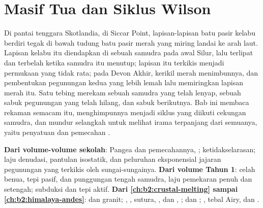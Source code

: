 \chapter{Masif Tua dan Siklus Wilson}\label{ch:b2:wilson-cycle}

Di pantai tenggara Skotlandia, di Siccar Point, lapisan-lapisan batu pasir kelabu berdiri tegak
di bawah tudung batu pasir merah yang miring landai ke arah laut. Lapisan kelabu itu diendapkan di
sebuah samudra pada awal Silur, lalu terlipat dan terbelah ketika samudra itu menutup; lapisan itu terkikis
menjadi permukaan yang tidak rata; pada Devon Akhir, kerikil merah menimbunnya, dan pembentukan pegunungan kedua
yang lebih lemah lalu memiringkan lapisan merah itu. Satu tebing merekam sebuah samudra yang telah
lenyap, sebuah sabuk pegunungan yang telah hilang, dan sabuk berikutnya. Bab ini membaca rekaman semacam itu,
menghimpunnya menjadi siklus yang diikuti cekungan samudra, dan mundur selangkah untuk melihat irama terpanjang
dari semuanya, yaitu penyatuan dan pemecahan .

\begin{recall}
\textbf{Dari volume-volume sekolah}: Pangea dan pemecahannya, ; ketidakselarasan;
laju denudasi, pantulan isostatik, dan peluruhan eksponensial jajaran pegunungan yang terkikis
oleh sungai-sungainya. \textbf{Dari volume Tahun 1}: celah benua, tepi pasif, dan
punggungan tengah samudra, laju pemekaran penuh dan setengah; subduksi dan tepi aktif.
\textbf{Dari \cref{ch:b2:crustal-melting} sampai \cref{ch:b2:himalaya-andes}}:  dan
granit; , , sutura, ,  dan , ;  dan
; , tebal Airy, dan .
\end{recall}

